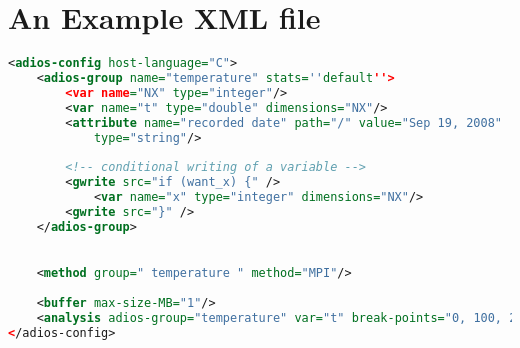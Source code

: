 \section{An Example XML file}

\begin{lstlisting}[language=XML, caption={Example XML file.}, label=list-example-xml]
<adios-config host-language="C">
    <adios-group name="temperature" stats=''default''>
        <var name="NX" type="integer"/>
        <var name="t" type="double" dimensions="NX"/>
        <attribute name="recorded date" path="/" value="Sep 19, 2008" 
            type="string"/> 
        
        <!-- conditional writing of a variable -->
        <gwrite src="if (want_x) {" />
            <var name="x" type="integer" dimensions="NX"/>
        <gwrite src="}" />
    </adios-group>

    
    <method group=" temperature " method="MPI"/>
    
    <buffer max-size-MB="1"/>
    <analysis adios-group="temperature" var="t" break-points="0, 100, 200, 300"/> 
</adios-config>
\end{lstlisting}

